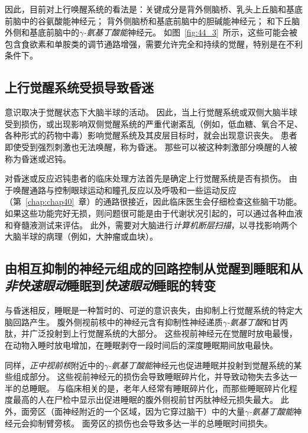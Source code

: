 因此，目前对上行唤醒系统的看法是：关键成分是背外侧脑桥、乳头上丘脑和基底前脑中的谷氨酸能神经元；
背外侧脑桥和基底前脑中的胆碱能神经元；
和下丘脑外侧和基底前脑中的\textit{$\gamma$-氨基丁酸能}神经元。
如图~\ref{fig:44_3}~所示，这些可能会被包含食欲素和单胺类的调节通路增强，需要允许完全和持续的觉醒，特别是在不利条件下。



\subsection{上行觉醒系统受损导致昏迷}

意识取决于觉醒状态下大脑半球的活动。
因此，当上行觉醒系统或双侧大脑半球受到损伤，或出现影响双侧觉醒系统的严重代谢紊乱（例如，低血糖、氧合不足、各种形式的药物中毒）影响觉醒系统及其皮层目标时，就会出现意识丧失。
患者即使受到强烈刺激也无法唤醒，称为昏迷。
那些可以被这种刺激部分唤醒的人被称为昏迷或迟钝。


对昏迷或反应迟钝患者的临床处理方法首先是确定上行觉醒系统是否有损伤。
由于唤醒通路与控制眼球运动和瞳孔反应以及呼吸和一些运动反应（第~\ref{chap:chap40}~章）的通路很接近，因此临床医生会仔细检查这些脑干功能。
如果这些功能完好无损，则问题很可能是由于代谢状况引起的，可以通过各种血液和脊髓液测试来评估。
此外，需要对大脑进行\textit{计算机断层扫描}，以寻找影响两个大脑半球的病理（例如，大肿瘤或血块）。



\subsection{由相互抑制的神经元组成的回路控制从觉醒到睡眠和从\textit{非快速眼动}睡眠到\textit{快速眼动}睡眠的转变}

与昏迷相反，睡眠是一种暂时的、可逆的意识丧失，由抑制上行觉醒系统的特定大脑回路产生。
腹外侧视前核中的神经元含有抑制性神经递质\textit{$\gamma$-氨基丁酸}和甘丙肽，并广泛投射到上行觉醒系统的大部分。
这些视前神经元在觉醒时放电最慢，在动物入睡时放电增加，在睡眠剥夺一段时间后的深度睡眠期间放电最快。


同样，\textit{正中视前核}附近中的\textit{$\gamma$-氨基丁酸能}神经元也促进睡眠并投射到觉醒系统的某些组成部分。
这些视前神经元的损伤会导致睡眠碎片化，并导致动物失去多达一半的总睡眠。
与临床相关的是，老年人经常有睡眠碎片化，而那些睡眠碎片化程度最高的人在尸检中显示出促进睡眠的腹外侧视前甘丙肽神经元损失最大。
此外，面旁区（面神经附近的一个区域，因为它穿过脑干）中的大量\textit{$\gamma$-氨基丁酸能}神经元会抑制臂旁核。
面旁区的损伤也会导致多达一半的总睡眠时间损失。


